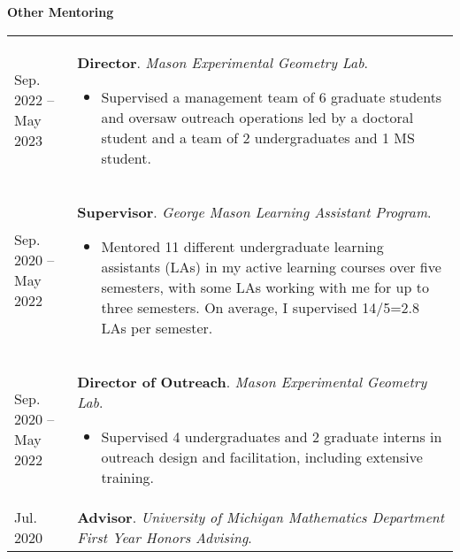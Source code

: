     \vspace{-1em}
    

    \textbf{\large Other Mentoring}
    
    \begin{center}
    {
    \renewcommand{\arraystretch}{1.5}
    \begin{longtable}{p{}  p{}}
     Sep.  2022 --  May  2023 & \textbf{Director}. \textit{Mason Experimental Geometry Lab}. 
        \hspace{-1em}

        {\small
        \begin{itemize}
        \setlength{\parindent}{0em}
        \item[] Supervised a management team of 6 graduate students and oversaw outreach operations led by a doctoral student and a team of 2 undergraduates and 1 MS student.
        \end{itemize}
        }
        \vspace{-1em}
         \\ 
 Sep.  2020 --  May  2022 & \textbf{Supervisor}. \textit{George Mason Learning Assistant Program}. 
        \hspace{-1em}

        {\small
        \begin{itemize}
        \setlength{\parindent}{0em}
        \item[] Mentored 11 different undergraduate learning assistants (LAs) in my active learning courses over five semesters, with some LAs working with me for up to three semesters. On average, I supervised 14/5=2.8 LAs per semester.
        \end{itemize}
        }
        \vspace{-1em}
         \\ 
 Sep.  2020 --  May  2022 & \textbf{Director of Outreach}. \textit{Mason Experimental Geometry Lab}. 
        \hspace{-1em}

        {\small
        \begin{itemize}
        \setlength{\parindent}{0em}
        \item[] Supervised 4 undergraduates and 2 graduate interns in outreach design and facilitation, including extensive training.
        \end{itemize}
        }
        \vspace{-1em}
         \\ 
 Jul.  2020 & \textbf{Advisor}. \textit{University of Michigan Mathematics Department First Year Honors Advising}.  
    \end{longtable}
    } 
    \end{center}

    \vspace{-1em}
    